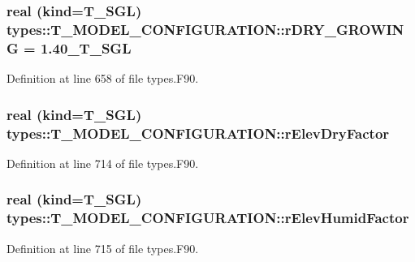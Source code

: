 \hypertarget{typetypes_1_1_t___m_o_d_e_l___c_o_n_f_i_g_u_r_a_t_i_o_n_a59bd3ec210409890bac9ff46b74789e8}{
\subsubsection[{rDRY\_\-GROWING}]{\setlength{\rightskip}{0pt plus 5cm}real (kind={\bf T\_\-SGL}) {\bf types::T\_\-MODEL\_\-CONFIGURATION::rDRY\_\-GROWING} = 1.40\_\-T\_\-SGL}}
\label{typetypes_1_1_t___m_o_d_e_l___c_o_n_f_i_g_u_r_a_t_i_o_n_a59bd3ec210409890bac9ff46b74789e8}


Definition at line 658 of file types.F90.

\hypertarget{typetypes_1_1_t___m_o_d_e_l___c_o_n_f_i_g_u_r_a_t_i_o_n_ac93c46ae336e46cbfbdfddb8a0706124}{
\subsubsection[{rElevDryFactor}]{\setlength{\rightskip}{0pt plus 5cm}real (kind={\bf T\_\-SGL}) {\bf types::T\_\-MODEL\_\-CONFIGURATION::rElevDryFactor}}}
\label{typetypes_1_1_t___m_o_d_e_l___c_o_n_f_i_g_u_r_a_t_i_o_n_ac93c46ae336e46cbfbdfddb8a0706124}


Definition at line 714 of file types.F90.

\hypertarget{typetypes_1_1_t___m_o_d_e_l___c_o_n_f_i_g_u_r_a_t_i_o_n_adbf1f733ef0b7de03bd76eff716d15f8}{
\subsubsection[{rElevHumidFactor}]{\setlength{\rightskip}{0pt plus 5cm}real (kind={\bf T\_\-SGL}) {\bf types::T\_\-MODEL\_\-CONFIGURATION::rElevHumidFactor}}}
\label{typetypes_1_1_t___m_o_d_e_l___c_o_n_f_i_g_u_r_a_t_i_o_n_adbf1f733ef0b7de03bd76eff716d15f8}


Definition at line 715 of file types.F90.

